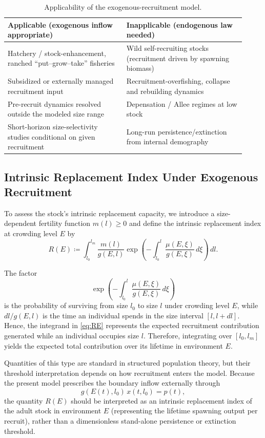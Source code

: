 \documentclass[pdflatex,sn-mathphys-num]{sn-jnl}
\theoremstyle{thmstyleone}
\theoremstyle{definition}
\theoremstyle{remark}
\begin{document}
\begin{table}[t]\centering
\caption{Applicability of the exogenous-recruitment model.}
\label{tab:applicability}
\begin{tabular}{p{0.46\linewidth}p{0.46\linewidth}}
\toprule
\textbf{Applicable (exogenous inflow appropriate)} & \textbf{Inapplicable (endogenous law needed)}\\
\midrule
Hatchery / stock-enhancement, ranched ``put--grow--take'' fisheries & Wild self-recruiting stocks (recruitment driven by spawning biomass)\\
Subsidized or externally managed recruitment input & Recruitment-overfishing, collapse and rebuilding dynamics\\
Pre-recruit dynamics resolved outside the modeled size range & Depensation / Allee regimes at low stock\\
Short-horizon size-selectivity studies conditional on given recruitment & Long-run persistence/extinction from internal demography\\
\bottomrule
\end{tabular}
\end{table}

\subsection{Intrinsic Replacement Index Under Exogenous Recruitment}
\label{subsec:replacement}

To assess the stock's intrinsic replacement capacity, we introduce a size-dependent
fertility function $m(l)\ge 0$ and define the intrinsic replacement index at
crowding level $E$ by
\begin{equation}\label{eq:RE}
R(E)\coloneqq
\int_{l_0}^{l_m}
\frac{m(l)}{g(E,l)}
\exp\!\left(
-\int_{l_0}^{l}\frac{\mu(E,\xi)}{g(E,\xi)}\,d\xi
\right)\,dl.
\end{equation}

The factor
\[
\exp\!\left(
-\int_{l_0}^{l}\frac{\mu(E,\xi)}{g(E,\xi)}\,d\xi
\right)
\]
is the probability of surviving from size $l_0$ to size $l$ under crowding level $E$,
while $dl/g(E,l)$ is the time an individual spends in the size interval $[l,l+dl]$.
Hence, the integrand in \eqref{eq:RE} represents the expected recruitment
contribution generated while an individual occupies size $l$.
Therefore, integrating over $[l_0,l_m]$ yields the expected total contribution over its lifetime in environment $E$.

Quantities of this type are standard in structured population theory, but their threshold interpretation depends on how recruitment enters the model. 
Because the present model prescribes the boundary inflow externally through
\[
g(E(t),l_0)\,x(t,l_0)=p(t),
\]
the quantity $R(E)$ should be interpreted as an intrinsic replacement index of the adult stock in environment $E$ (representing the lifetime spawning output per recruit), rather than a dimensionless stand-alone persistence or extinction threshold.
\end{document}
